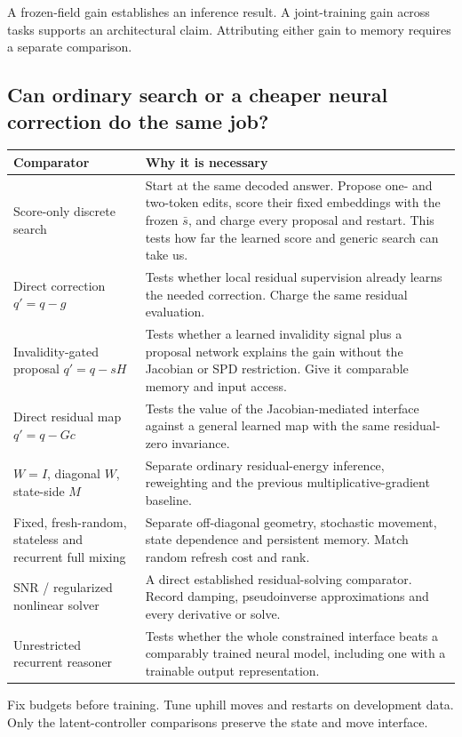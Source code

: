\documentclass[11pt,a4paper]{article}
\begin{document}
A frozen-field gain establishes an inference result. A joint-training gain across tasks supports an architectural claim. Attributing either gain to memory requires a separate comparison.

\subsection{Can ordinary search or a cheaper neural correction do the same job?}
\begin{longtable}{@{}P{40mm}P{119mm}@{}}\toprule
Comparator & Why it is necessary\\\midrule\endhead
Score-only discrete search & Start at the same decoded answer. Propose one- and two-token edits, score their fixed embeddings with the frozen $\bar s$, and charge every proposal and restart. This tests how far the learned score and generic search can take us.\\
Direct correction $q'=q-g$ & Tests whether local residual supervision already learns the needed correction. Charge the same residual evaluation.\\
Invalidity-gated proposal $q'=q-sH$ & Tests whether a learned invalidity signal plus a proposal network explains the gain without the Jacobian or SPD restriction. Give it comparable memory and input access.\\
Direct residual map $q'=q-Gc$ & Tests the value of the Jacobian-mediated interface against a general learned map with the same residual-zero invariance.\\
$W=I$, diagonal $W$, state-side $M$ & Separate ordinary residual-energy inference, reweighting and the previous multiplicative-gradient baseline.\\
Fixed, fresh-random, stateless and recurrent full mixing & Separate off-diagonal geometry, stochastic movement, state dependence and persistent memory. Match random refresh cost and rank.\\
SNR / regularized nonlinear solver & A direct established residual-solving comparator. Record damping, pseudoinverse approximations and every derivative or solve.\\
Unrestricted recurrent reasoner & Tests whether the whole constrained interface beats a comparably trained neural model, including one with a trainable output representation.\\\bottomrule
\end{longtable}

Fix budgets before training. Tune uphill moves and restarts on development data. Only the latent-controller comparisons preserve the state and move interface.
\end{document}
